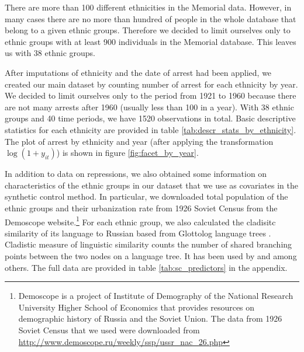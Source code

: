 There are more than 100 different ethnicities in the Memorial data. 
However, in many cases there are no more than hundred of people in the whole database that belong to a given ethnic groups. 
Therefore we decided to limit ourselves only to ethnic groups with at least 900 individuals in the Memorial database. 
This leaves us with 38 ethnic groups. 


After imputations of ethnicity and the date of arrest had been applied,  we created our main dataset by counting number of arrest for each ethnicity by year. 
We decided to limit ourselves only to the period from 1921 to 1960 because there are not many arrests after 1960 (usually less than 100 in a year). 
With 38  ethnic groups  and 40 time periods, we have 1520 observations in total. Basic descriptive statistics  for each ethnicity are provided in table \ref{tab:descr_stats_by_ethnicity}.  The plot of arrest by ethnicity and year (after applying the transformation $\log\left(1 + y_{it}\right)$) is shown in figure \ref{fig:facet_by_year}. 

In addition to data on repressions, we also obtained some information on characteristics of the  ethnic groups in our dataset that we use as covariates in the synthetic control method. 
In particular, we downloaded total population of the ethnic groups and their urbanization rate from 1926 Soviet Census from the Demoscope website.\footnote{Demoscope is a project of Institute of Demography of the National Research University Higher School of Economics that provides resources on demographic history of Russia and the Soviet Union. The data from  1926 Soviet Census that we used  were downloaded from \url{http://www.demoscope.ru/weekly/ssp/ussr_nac_26.php}} For each ethnic group, we also calculated the cladisitc similarity of its language to Russian based from Glottolog language trees \citep{hammarstrom_glottolog_2018}.
Cladistic measure of linguistic similarity counts the number of shared branching points between the two nodes on a language tree. It has been used by \citet{fearon_ethnic_2003} and \citet{dickens_ethnolinguistic_2018} among others. 
The full data are provided in table \ref{tab:sc_predictors} in the appendix.

